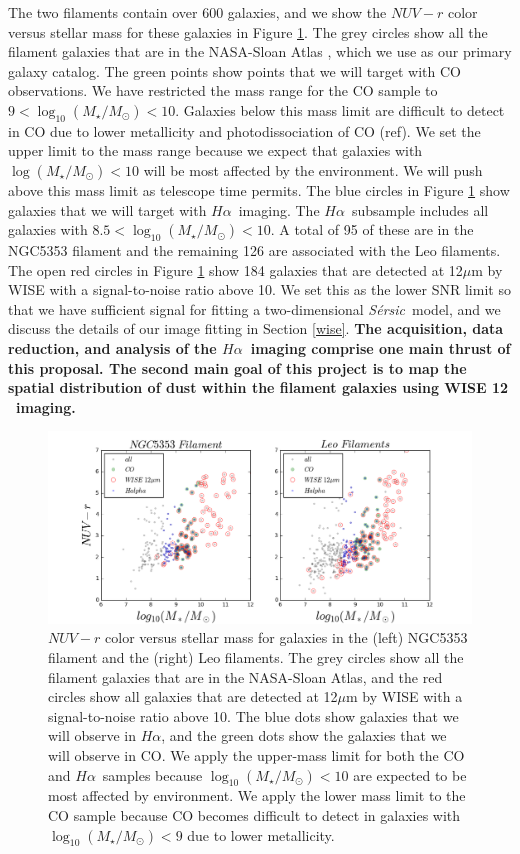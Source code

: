 \documentclass[11pt, preprint]{aastex}
\newcommand{\ha}{$H\alpha$}
\newcommand{\sers}{{\it S\'{e}rsic}}
\begin{document}
The two filaments contain over 600 galaxies, and we show the $NUV-r$
color versus stellar mass for these galaxies in Figure \ref{sample}.
The grey circles show all the filament galaxies that are in the
NASA-Sloan Atlas \citep{blanton05}, which we use as our primary galaxy
catalog.  The green points show points
that we will target with CO observations.  We have restricted the mass
range for the CO sample to $9 < \log_{10} (M_\star/M_\odot) < 10$.
Galaxies below this mass limit are difficult to detect in CO due
to lower metallicity and photodissociation of CO (ref).  We set the
upper limit to the mass range because we expect that galaxies with
$\log (M_\star/M_\odot) < 10$ will be most affected by the
environment.  We will push above this mass limit as telescope time
permits.
The blue circles in Figure \ref{sample} show galaxies that we will
target with \ha \ imaging.   The \ha \ subsample includes all galaxies
with $8.5 < \log_{10} (M_\star/M_\odot) < 10$.  A total of 95 of these
are in the NGC5353 filament and the remaining 126 are associated with
the Leo filaments. 
The open red circles in Figure \ref{sample} show 184 galaxies that are
detected at 12$\mu$m by WISE with a signal-to-noise ratio above 10.
We set this as the lower SNR limit so that we have sufficient signal for
fitting a two-dimensional \sers \ model, and we discuss the details of
our image fitting in Section \ref{wise}.
{\bf  The acquisition, data reduction, and analysis of
the \ha \ imaging comprise one main thrust of this proposal.
The second main goal of this project is to map the spatial
distribution of dust within the filament galaxies using WISE 12\micron
\ imaging.  }


\begin{figure}[h]
\includegraphics[width=\textwidth]{sample.png}
\caption{\small $NUV-r$ color versus stellar mass for galaxies 
  in the (left) NGC5353 filament and the (right) Leo filaments.
The grey circles show all the filament galaxies that are in the
NASA-Sloan Atlas, and the red circles show all galaxies that are
detected at 12$\mu$m by WISE with a signal-to-noise ratio above 10.
The blue dots show galaxies that we will observe in \ha, and the green
dots show the galaxies that we will observe in CO.  We apply the upper-mass
limit for both the CO and \ha \ samples because
$\log_{10}(M_\star/M_\odot) < 10$ are expected to be most affected by
environment.  We apply the lower mass limit to the CO sample because
CO becomes difficult to detect in galaxies with
$\log_{10}(M_\star/M_\odot) < 9$ due to lower metallicity.}
\label{sample}
\end{figure}
\end{document}
